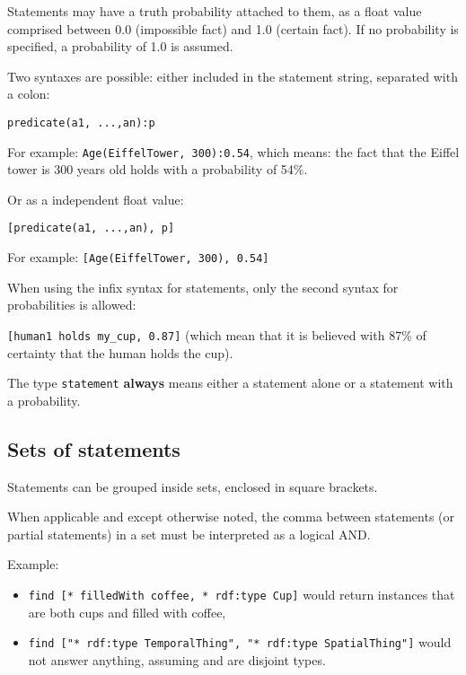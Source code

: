 Statements may have a truth probability attached to them, as a float value
comprised between 0.0 (impossible fact) and 1.0 (certain fact). If no
probability is specified, a probability of 1.0 is assumed.

Two syntaxes are possible: either included in the statement string, separated
with a colon:

\begin{center} \tt predicate(a1, ...,an):p \end{center}

For example: {\tt Age(EiffelTower, 300):0.54}, which means: the fact that the
Eiffel tower is 300 years old holds with a probability of 54\%.

Or as a independent float value:

\begin{center} \tt [predicate(a1, ...,an), p] \end{center}

For example: \texttt{[Age(EiffelTower, 300), 0.54]}

When using the infix syntax for statements, only the second syntax for
probabilities is allowed:

\texttt{[human1 holds my\_cup, 0.87]} (which mean that it is believed with 87\%
of certainty that the human holds the cup).

The type \texttt{statement} \textbf{always} means either a statement alone or a
statement with a probability.


\subsection{Sets of statements}

Statements can be grouped inside sets, enclosed in square brackets.

When applicable and except otherwise noted, the comma between statements (or
partial statements) in a set must be interpreted as a logical AND.

Example:

\begin{itemize}
    \item {\tt find [* filledWith coffee, * rdf:type Cup]} would return
    instances that are both cups and filled with coffee,

    \item {\tt find ["* rdf:type TemporalThing", "* rdf:type SpatialThing"]}
    would not answer anything, assuming  and
     are disjoint types.

\end{itemize}


